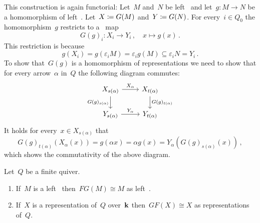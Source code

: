 \begin{remark}
\begin{enumerate}
      This construction is again functorial:
      Let~$M$ and~$N$ be left~{} and let~$g \colon M \to N$ be a homomorphism of left~{}.
      Let~$X \coloneqq G(M)$ and~$Y \coloneqq G(N)$.
      For every~$i \in Q_0$ the homomorphism~$g$ restricts to a~{\klin} map
      \[
                G(g)_i
        \colon  X_i
        \to     Y_i \,,
        \quad   x
        \mapsto g(x) \,.
      \]
      This restriction is {\welldef} because
      \[
                  g(X_i)
        =         g(\varepsilon_i M)
        =         \varepsilon_i g(M)
        \subseteq \varepsilon_i N
        =         Y_i \,.
      \]
      To show that~$G(g)$ is a homomorphism of representations we need to show that for every arrow~$\alpha$ in~$Q$ the following diagram commutes:
      \[
        \begin{tikzcd}
            X_{s(\alpha)}
            \arrow{r}[above]{X_\alpha}
            \arrow{d}[left]{G(g)_{s(\alpha)}}
          & X_{t(\alpha)}
            \arrow{d}[right]{G(g)_{t(\alpha)}}
          \\
            Y_{s(\alpha)}
            \arrow{r}[above]{Y_\alpha}
          & Y_{t(\alpha)}
        \end{tikzcd}
      \]
      It holds for every~$x \in X_{s(\alpha)}$ that
      \[
          G(g)_{t(\alpha)}( X_\alpha( x ) )
        = g(\alpha x)
        = \alpha g(x)
        = Y_\alpha( G(g)_{s(\alpha)}(x) ) \,,
      \]
      which shows the commutativity of the above diagram.
  \end{enumerate}
\end{remark}


\begin{theorem}
  \label{quiver rep are modules}
  Let~$Q$ be a finite quiver.
  \begin{enumerate}
    \item
      If~$M$ is a left~{} then~$FG(M) \cong M$ as left~{}.
    \item
      If~$X$ is a representation of~$Q$ over~$\mathbf{k}$ then~$GF(X) \cong X$ as representations of~$Q$.
  \end{enumerate}
\end{theorem}


